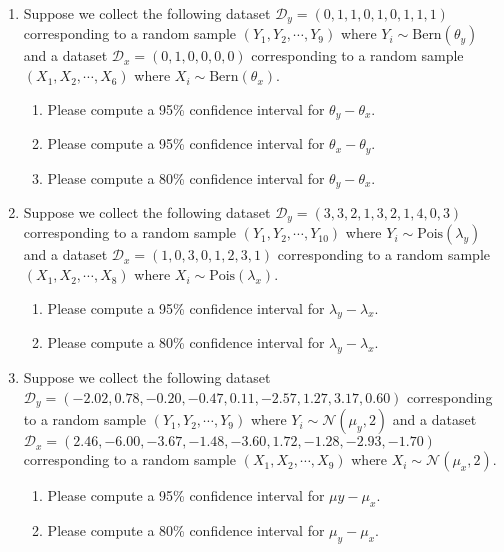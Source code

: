 \begin{enumerate}
    \item Suppose we collect the following dataset $\mathcal{D}_{y} = (0,1,1,0,1,0,1,1,1 )$ corresponding to a random sample $(Y_{1},Y_{2},\cdots,Y_{9})$ where $Y_{i} \sim \text{Bern}(\theta_{y})$ and a dataset $\mathcal{D}_{x} = (0,1,0,0,0,0)$ corresponding to a random sample $(X_{1},X_{2},\cdots,X_{6})$ where $X_{i} \sim \text{Bern}(\theta_{x})$.
    
    \begin{enumerate}
        \item Please compute a 95\% confidence interval for $\theta_{y} - \theta_{x}$.
        \item Please compute a 95\% confidence interval for $\theta_{x} - \theta_{y}$.
        \item Please compute a 80\% confidence interval for $\theta_{y} - \theta_{x}$.
    \end{enumerate}
    
    \item Suppose we collect the following dataset $\mathcal{D}_{y} = (3,3,2,1,3,2,1,4,0,3)$ corresponding to a random sample $(Y_{1},Y_{2},\cdots,Y_{10})$ where $Y_{i} \sim \text{Pois}(\lambda_{y})$ and a dataset $\mathcal{D}_{x} = (1, 0, 3, 0, 1, 2, 3, 1)$ corresponding to a random sample $(X_{1},X_{2},\cdots,X_{8})$ where $X_{i} \sim \text{Pois}(\lambda_{x})$.
    
    \begin{enumerate}
        \item Please compute a 95\% confidence interval for $\lambda_{y} - \lambda_{x}$.
        \item Please compute a 80\% confidence interval for $\lambda_{y} - \lambda_{x}$.
    \end{enumerate}
    
     \item Suppose we collect the following dataset $\mathcal{D}_{y} = (-2.02,  0.78, -0.20, -0.47,  0.11, -2.57,  1.27,  3.17, 0.60)$ corresponding to a random sample $(Y_{1},Y_{2},\cdots,Y_{9})$ where $Y_{i} \sim \mathcal{N}(\mu_{y},2)$ and a dataset $\mathcal{D}_{x} = (2.46, -6.00, -3.67, -1.48, -3.60,  1.72, -1.28, -2.93, -1.70)$ corresponding to a random sample $(X_{1},X_{2},\cdots,X_{9})$ where $X_{i} \sim \mathcal{N}(\mu_{x},2)$.
    
    \begin{enumerate}
        \item Please compute a 95\% confidence interval for $\mu{y} - \mu_{x}$.
        \item Please compute a 80\% confidence interval for $\mu_{y} - \mu_{x}$.
    \end{enumerate}
        

\end{enumerate}
